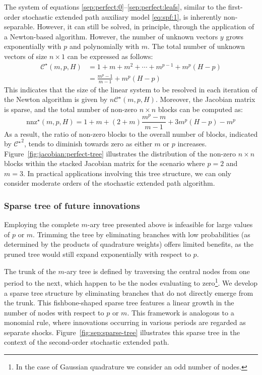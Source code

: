 \documentclass[a4paper,11pt]{amsart}
\begin{document}
The system of equations
\eqref{sep:perfect:0}--\eqref{sep:perfect:leafs}, similar to the
first-order stochastic extended path auxiliary model \eqref{eq:spf:1},
is inherently non-separable. However, it can still be solved, in
principle, through the application of a Newton-based
algorithm. However, the number of unknown vectors $y$ grows
exponentially with $p$ and polynomially with $m$. The total number of
unknown vectors of size $n \times 1$ can be expressed as follows:
\[
   \begin{split}
      \mathcal C^{\star}(m,p,H) & = 1 + m + m^2 + \cdots + m^{p-1} + m^p(H-p) \\
                                & = \frac{m^p - 1}{m - 1} + m^p(H - p)
   \end{split}
\]
This indicates that the size of the linear system to be resolved in
each iteration of the Newton algorithm is given
by $n \mathcal C^{\star}(m,p,H)$. Moreover, the Jacobian matrix is
sparse, and the total number of non-zero $n \times n$ blocks can be
computed as:
\[
   \mathrm{nnz}^{\star}(m,p,H) = 1 + m + (2 + m) \frac{m^p - m}{m - 1} + 3m^p(H - p) - m^p
\]
As a result, the ratio of non-zero blocks to the overall number of
blocks, indicated by $\left.\mathcal C^{\star}\right.^2$, tends to
diminish towards zero as either $m$ or $p$
increases. Figure~\ref{fig:jacobian:perfect-tree} illustrates the
distribution of the non-zero $n \times n$ blocks within the stacked
Jacobian matrix for the scenario where \( p = 2 \) and \( m = 3 \). In
practical applications involving this tree structure, we can only
consider moderate orders of the stochastic extended path algorithm.\newline

\subsubsection{Sparse tree of future innovations}\label{sec:fishbone-tree} Employing the
complete $m$-ary tree presented above is infeasible for large values
of $p$ or $m$. Trimming the tree by eliminating branches with low
probabilities (as determined by the products of quadrature weights)
offers limited benefits, as the pruned tree would still expand
exponentially with respect to $p$.\newline

The trunk of the $m$-ary tree is defined by traversing the central
nodes from one period to the next, which happen to be the nodes
evaluating to zero\footnote{In the case of Gaussian quadrature we
   consider an odd number of nodes.}. We develop a sparse tree
structure by eliminating branches that do not directly emerge from the
trunk. This fishbone-shaped sparse tree features a linear growth in
the number of nodes with respect to $p$ or $m$. This framework is
analogous to a monomial rule, where innovations occurring in various
periods are regarded as separate
shocks. Figure~\ref{fig:sep:sparse-tree} illustrates this sparse tree
in the context of the second-order stochastic extended path.\newline
\end{document}
